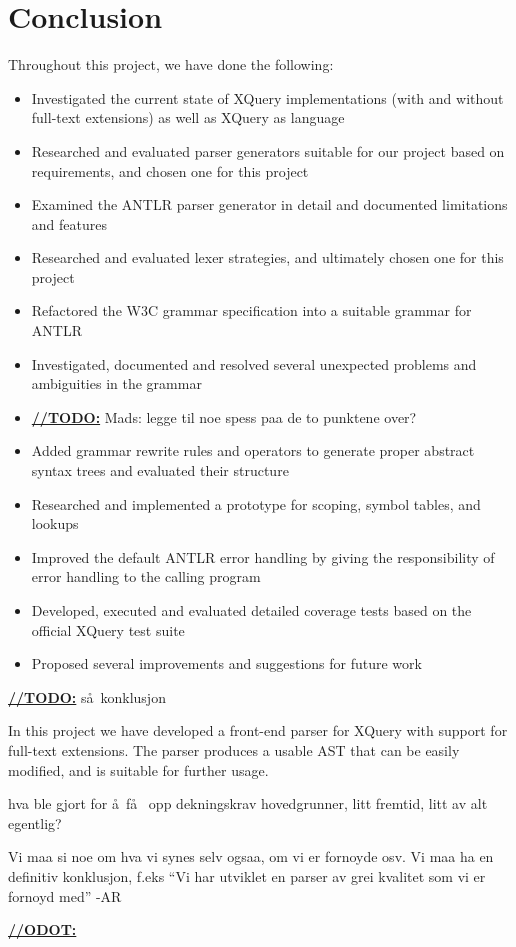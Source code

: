 \chapter{Conclusion}
\label{chapter:conclusion}
Throughout this project, we have done the following:
\begin{itemize}
  \item Investigated the current state of XQuery implementations (with and
  without full-text extensions) as well as XQuery as language
  \item Researched and evaluated parser generators suitable
  for our project based on requirements, and chosen one for this project
  \item Examined the ANTLR parser generator in detail and documented
  limitations and features
  \item Researched and evaluated lexer strategies, and ultimately chosen one
  for this project
  \item Refactored the W3C grammar specification into a suitable grammar for
  ANTLR
  \item Investigated, documented and resolved several unexpected problems and
  ambiguities in the grammar
  \item \underline{\textbf{\LARGE //TODO:}} Mads: legge til noe spess paa de to
  punktene over?
  \item Added grammar rewrite rules and operators to generate proper abstract
  syntax trees and evaluated their structure
  \item Researched and implemented a prototype for scoping, symbol tables, and
  lookups
  \item Improved the default ANTLR error handling by giving the responsibility
  of error handling to the calling program
  \item Developed, executed and evaluated detailed coverage tests based on the
  official XQuery test suite
  \item Proposed several improvements and suggestions for future work
\end{itemize}


\underline{\textbf{\LARGE //TODO:}}
s\aa~konklusjon

In this project we have developed a front-end parser for XQuery with support for
full-text extensions. The parser produces a usable AST that can be easily
modified, and is suitable for further usage.

hva ble gjort for \aa ~f\aa~ opp dekningskrav hovedgrunner, litt fremtid, litt
av alt egentlig? 

Vi maa si noe om hva vi synes selv ogsaa, om vi er fornoyde osv. Vi maa ha en
definitiv konklusjon, f.eks ``Vi har utviklet en parser av grei kvalitet som vi
er fornoyd med'' 
-AR

\underline{\textbf{\LARGE //ODOT:}}